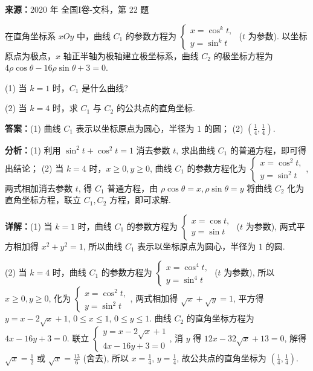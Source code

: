 \begin{question}[points=10]
\textbf{来源：}2020 年 全国I卷-文科，第 22 题\par
在直角坐标系 $xOy$ 中，曲线 $C_1$ 的参数方程为 $\begin{cases} x = \cos^k t, \\ y = \sin^k t \end{cases}$ ($t$ 为参数). 以坐标原点为极点，$x$ 轴正半轴为极轴建立极坐标系，曲线 $C_2$ 的极坐标方程为 $4\rho\cos\theta - 16\rho\sin\theta + 3 = 0$.



(1) 当 $k=1$ 时，$C_1$ 是什么曲线?



(2) 当 $k=4$ 时，求 $C_1$ 与 $C_2$ 的公共点的直角坐标.
\begin{solution}
\textbf{答案：}(1) 曲线 $C_1$ 表示以坐标原点为圆心，半径为 $1$ 的圆； (2) $\left(\frac{1}{4}, \frac{1}{4}\right)$.

\textbf{分析：}(1) 利用 $\sin^2 t + \cos^2 t = 1$ 消去参数 $t$, 求出曲线 $C_1$ 的普通方程，即可得出结论； (2) 当 $k=4$ 时，$x\ge 0, y\ge 0$, 曲线 $C_1$ 的参数方程化为 $\begin{cases} x = \cos^2 t, \\ y = \sin^2 t \end{cases}$, 两式相加消去参数 $t$, 得 $C_1$ 普通方程，由 $\rho\cos\theta = x, \rho\sin\theta = y$ 将曲线 $C_2$ 化为直角坐标方程，联立 $C_1, C_2$ 方程，即可求解.

\textbf{详解：}(1) 当 $k=1$ 时，曲线 $C_1$ 的参数方程为 $\begin{cases} x = \cos t, \\ y = \sin t \end{cases}$ ($t$ 为参数), 两式平方相加得 $x^2+y^2=1$, 所以曲线 $C_1$ 表示以坐标原点为圆心，半径为 $1$ 的圆.

(2) 当 $k=4$ 时，曲线 $C_1$ 的参数方程为 $\begin{cases} x = \cos^4 t, \\ y = \sin^4 t \end{cases}$ ($t$ 为参数), 所以 $x\ge0, y\ge0$, 化为 $\begin{cases} x = \cos^2 t, \\ y = \sin^2 t \end{cases}$, 两式相加得 $\sqrt{x} + \sqrt{y} = 1$, 平方得 $y = x - 2\sqrt{x} + 1$, $0\le x\le 1$, $0\le y\le 1$. 曲线 $C_2$ 的直角坐标方程为 $4x - 16y + 3 = 0$. 联立 $\begin{cases} y = x - 2\sqrt{x} + 1 \\ 4x - 16y + 3 = 0 \end{cases}$, 消 $y$ 得 $12x - 32\sqrt{x} + 13 = 0$, 解得 $\sqrt{x} = \frac{1}{2}$ 或 $\sqrt{x} = \frac{13}{6}$ (舍去), 所以 $x = \frac{1}{4}$, $y = \frac{1}{4}$, 故公共点的直角坐标为 $\left(\frac{1}{4}, \frac{1}{4}\right)$.
\end{solution}
\end{question}

